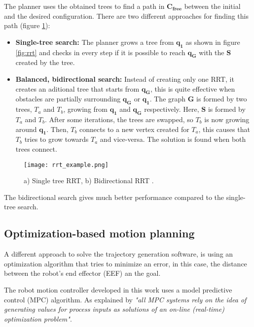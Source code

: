 The planner uses the obtained trees to find a path in $\bm{C_{free}}$ between the initial and the desired configuration. There are two different approaches for finding this path (figure \ref{fig:rrt_ex}):
\begin{itemize}
	\item \textbf{Single-tree search:} The planner grows a tree from $\bm{q_1}$ as shown in figure \ref{fig:rrt} and checks in every step if it is possible to reach $\bm{q_G}$ with the $\bm{S}$ created by the tree.
	\item \textbf{Balanced, bidirectional search:} Instead of creating only one RRT, it creates an aditional tree that starts from $\bm{q_G}$, this is quite effective when obstacles are partially surrounding $\bm{q_G}$ or $\bm{q_1}$. The graph $\bm{G}$ is formed by two trees, $T_a$ and $T_b$, growing from $\bm{q_1}$ and $\bm{q_G}$ respectively. Here, $\bm{S}$ is formed by $T_a$ and $T_b$. After some iterations, the trees are swapped, so $T_b$ is now growing around $\bm{q_1}$. Then, $T_b$ connects to a new vertex created for $T_a$, this causes that $T_b$ tries to grow towards $T_a$ and vice-versa. The solution is found when both trees connect.
\end{itemize}

\begin{figure}[H]
	\centering
	\texttt{[image: rrt\_example.png]}
	\vspace{-10pt}
	\caption[Single and bidirectional RTT]{ a) Single tree RRT, b) Bidirectional RRT \citep[chap.5, page 219]{planning}.}
	\vspace{-15pt}
	\label{fig:rrt_ex}
\end{figure}

The bidirectional search gives much better performance compared to the single-tree search.

\subsection{Optimization-based motion planning}
\label{sub:optimization}
A different approach to solve the trajectory generation software, is using an optimization algorithm that tries to minimize an error, in this case, the distance between the robot's end effector (EEF) an the goal.
 
The robot motion controller developed in this work uses a model predictive control (MPC) algorithm. As explained by \citet{mpc} \textit{"all MPC systems rely on the idea of generating values for process inputs as solutions of an on-line (real-time) optimization problem"}. 

